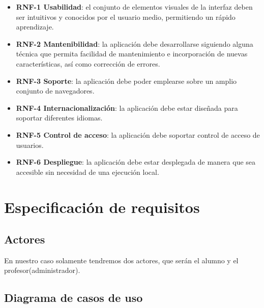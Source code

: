 \begin{itemize}
	\item \textbf{RNF-1 Usabilidad}: el conjunto de elementos visuales de la interfaz deben ser intuitivos y conocidos por el usuario medio, permitiendo un rápido aprendizaje.
	\item \textbf{RNF-2 Mantenibilidad}: la aplicación debe desarrollarse siguiendo alguna técnica que permita facilidad de mantenimiento e incorporación de nuevas características, así como corrección de errores.
	\item \textbf{RNF-3 Soporte}: la aplicación debe poder emplearse sobre un amplio conjunto de navegadores.
	\item \textbf{RNF-4 Internacionalización}: la aplicación debe estar diseñada para soportar diferentes idiomas.
	\item \textbf{RNF-5 Control de acceso}: la aplicación debe soportar control de acceso de usuarios.
	\item \textbf{RNF-6 Despliegue}: la aplicación debe estar desplegada de manera que sea accesible sin necesidad de una ejecución local.
\end{itemize}

\section{Especificación de requisitos}

\subsection{Actores}
En nuestro caso solamente tendremos dos actores, que serán el alumno y el profesor(administrador).

\subsection{Diagrama de casos de uso}


